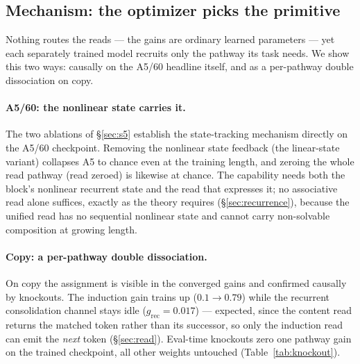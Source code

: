 \documentclass[11pt]{article}
\begin{document}
\subsection{Mechanism: the optimizer picks the primitive}
\label{sec:mechanism}

Nothing routes the reads --- the gains are ordinary learned parameters --- yet
each separately trained model recruits only the pathway its task needs. We show
this two ways: causally on the A5/60 headline itself, and as a per-pathway
double dissociation on copy.

\paragraph{A5/60: the nonlinear state carries it.} The two ablations of
\S\ref{sec:s5} establish the state-tracking mechanism directly on the A5/60
checkpoint. Removing the nonlinear state feedback (the linear-state variant)
collapses A5 to chance even at the training length, and zeroing the whole read
pathway (read zeroed) is likewise at chance. The capability needs both the
block's nonlinear recurrent state and the read that expresses it; no
associative read alone suffices, exactly as the theory requires
(\S\ref{sec:recurrence}), because the unified read has no sequential nonlinear
state and cannot carry non-solvable composition at growing length.

\paragraph{Copy: a per-pathway double dissociation.} On copy the assignment is
visible in the converged gains and confirmed causally by knockouts. The
induction gain trains up ($0.1 \to 0.79$) while the recurrent consolidation
channel stays idle ($g_{\mathrm{rec}} = 0.017$) --- expected, since the content
read returns the matched token rather than its successor, so only the induction
read can emit the \emph{next} token (\S\ref{sec:read}). Eval-time knockouts
zero one pathway gain on the trained checkpoint, all other weights untouched
(Table~\ref{tab:knockout}).
\end{document}
